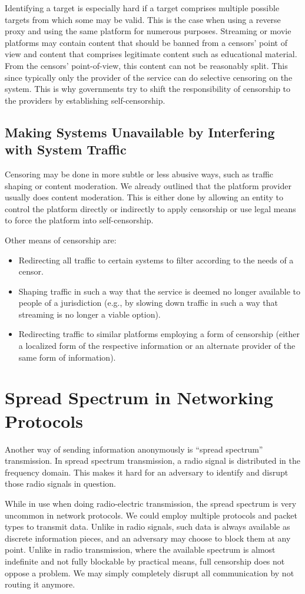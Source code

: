 Identifying a target is especially hard if a target comprises multiple possible targets from which some may be valid. This is the case when using a reverse proxy and using the same platform for numerous purposes. Streaming or movie platforms may contain content that should be banned from a censors' point of view and content that comprises legitimate content such as educational material. From the censors' point-of-view, this content can not be reasonably split. This since typically only the provider of the service can do selective censoring on the system. This is why governments try to shift the responsibility of censorship to the providers by establishing self-censorship. 

\subsection{Making Systems Unavailable by Interfering with System Traffic}
Censoring may be done in more subtle or less abusive ways, such as traffic shaping or content moderation. We already outlined that the platform provider usually does content moderation. This is either done by allowing an entity to control the platform directly or indirectly to apply censorship or use legal means to force the platform into self-censorship.

Other means of censorship are:
\begin{itemize}
	\item Redirecting all traffic to certain systems to filter according to the needs of a censor.
	\item Shaping traffic in such a way that the service is deemed no longer available to people of a jurisdiction (e.g., by slowing down traffic in such a way that streaming is no longer a viable option).
	\item Redirecting traffic to similar platforms employing a form of censorship (either a localized form of the respective information or an alternate provider of the same form of information).
\end{itemize}

\section{Spread Spectrum in Networking Protocols}
Another way of sending information anonymously is ``spread spectrum'' transmission. In spread spectrum transmission, a radio signal is distributed in the frequency domain. This makes it hard for an adversary to identify and disrupt those radio signals in question. 

While in use when doing radio-electric transmission, the spread spectrum is very uncommon in network protocols. We could employ multiple protocols and packet types to transmit data. Unlike in radio signals, such data is always available as discrete information pieces, and an adversary may choose to block them at any point. Unlike in radio transmission, where the available spectrum is almost indefinite and not fully blockable by practical means, full censorship does not oppose a problem. We may simply completely disrupt all communication by not routing it anymore.

